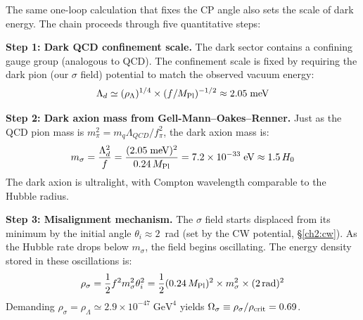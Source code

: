 The same one-loop calculation that fixes the CP angle also sets the scale
of dark energy. The chain proceeds through five quantitative steps:

\begin{center}
\end{center}

\textbf{Step 1: Dark QCD confinement scale.}
The dark sector contains a confining gauge group (analogous to QCD).
The confinement scale is fixed by requiring the dark pion (our $\sigma$ field)
potential to match the observed vacuum energy:
\begin{equation}
  \Lambda_d \simeq (\rho_\Lambda)^{1/4} \times (f/M_{\rm Pl})^{-1/2}
  \approx 2.05\;\text{meV}
\end{equation}

\textbf{Step 2: Dark axion mass from Gell-Mann--Oakes--Renner.}
Just as the QCD pion mass is $m_\pi^2 = m_q\Lambda_{QCD}/f_\pi^2$,
the dark axion mass is:
\begin{equation}
  m_\sigma = \frac{\Lambda_d^2}{f}
  = \frac{(2.05\;\text{meV})^2}{0.24\,M_{\rm Pl}}
  = 7.2 \times 10^{-33}\;\text{eV}
  \approx 1.5\,H_0
\end{equation}
The dark axion is ultralight, with Compton wavelength comparable to the Hubble radius.

\textbf{Step 3: Misalignment mechanism.}
The $\sigma$ field starts displaced from its minimum by the initial angle
$\theta_i \approx 2$~rad (set by the CW potential, \S\ref{ch2:cw}). As
the Hubble rate drops below $m_\sigma$, the field begins oscillating.
The energy density stored in these oscillations is:
\begin{equation}
  \rho_\sigma = \frac{1}{2}f^2 m_\sigma^2 \theta_i^2
  = \frac{1}{2}(0.24\,M_{\rm Pl})^2 \times m_\sigma^2 \times (2\,\text{rad})^2
\end{equation}
Demanding $\rho_\sigma = \rho_\Lambda \simeq 2.9 \times 10^{-47}\;\text{GeV}^4$
yields $\Omega_\sigma \equiv \rho_\sigma/\rho_{\rm crit} = 0.69$.

